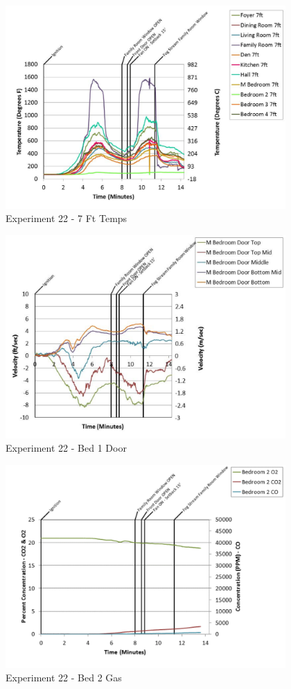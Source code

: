 \documentclass{article}
\begin{document}
\begin{appendices}
	\begin{figure}[h!]
		\centering
		\includegraphics[height=3.05in]{0_Images/Results_Charts/Exp_22_Charts/7FtTemps.pdf}
		\caption{Experiment 22 - 7 Ft Temps}
	\end{figure}
 
	\clearpage

	\begin{figure}[h!]
		\centering
		\includegraphics[height=3.05in]{0_Images/Results_Charts/Exp_22_Charts/Bed1Door.pdf}
		\caption{Experiment 22 - Bed 1 Door}
	\end{figure}
 

	\begin{figure}[h!]
		\centering
		\includegraphics[height=3.05in]{0_Images/Results_Charts/Exp_22_Charts/Bed2Gas.pdf}
		\caption{Experiment 22 - Bed 2 Gas}
	\end{figure}
 

\end{appendices}
\end{document}
